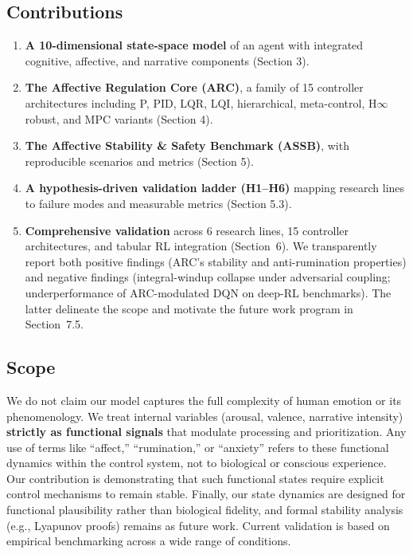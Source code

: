 \documentclass{article}
\begin{document}
\subsection{Contributions}

\begin{enumerate}
    \item \textbf{A 10-dimensional state-space model} of an agent with integrated cognitive, affective, and narrative components (Section 3).
    \item \textbf{The Affective Regulation Core (ARC)}, a family of 15 controller architectures including P, PID, LQR, LQI, hierarchical, meta-control, H$\infty$ robust, and MPC variants (Section 4).
    \item \textbf{The Affective Stability \& Safety Benchmark (ASSB)}, with reproducible scenarios and metrics (Section 5).
    \item \textbf{A hypothesis-driven validation ladder (H1--H6)} mapping research lines to failure modes and measurable metrics (Section 5.3).
    \item \textbf{Comprehensive validation} across 6 research lines, 15 controller architectures, and tabular RL integration (Section~6). We transparently report both positive findings (ARC's stability and anti-rumination properties) and negative findings (integral-windup collapse under adversarial coupling; underperformance of ARC-modulated DQN on deep-RL benchmarks). The latter delineate the scope and motivate the future work program in Section~7.5.
\end{enumerate}

\subsection{Scope}

We do not claim our model captures the full complexity of human emotion or its phenomenology. We treat internal variables (arousal, valence, narrative intensity) \textbf{strictly as functional signals} that modulate processing and prioritization. Any use of terms like ``affect,'' ``rumination,'' or ``anxiety'' refers to these functional dynamics within the control system, not to biological or conscious experience. Our contribution is demonstrating that such functional states require explicit control mechanisms to remain stable. Finally, our state dynamics are designed for functional plausibility rather than biological fidelity, and formal stability analysis (e.g., Lyapunov proofs) remains as future work. Current validation is based on empirical benchmarking across a wide range of conditions.
\end{document}
